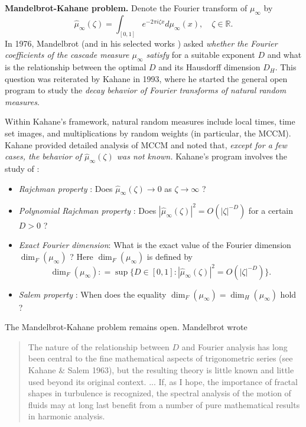 \documentclass[12pt]{amsart}
\theoremstyle{definition}
\theoremstyle{remark}
\numberwithin{equation}{section}
\begin{document}
{\flushleft \bf Mandelbrot-Kahane problem.}  
Denote  the Fourier transform of  $\mu_\infty$ by 
\[
\widehat{\mu}_\infty (\zeta)=\int_{[0,1]} e^{-2\pi i\zeta x}d\mu_\infty(x),\quad \zeta\in \mathbb{R}.
\]
In 1976, Mandelbrot \cite{M76} (and in his selected works \cite[pp. 402]{MA-book}) asked {\it  whether the Fourier coefficients of the cascade measure $\mu_\infty$ satisfy 
} for a suitable exponent $D$ and what is the relationship between the optimal $D$ and its Hausdorff dimension $D_H$.  This question was  reiterated  by Kahane \cite{Ka-93} in 1993, where he started the general open program to study the {\it decay behavior of Fourier transforms of natural random measures}. 

Within Kahane's framework, natural random measures include local times, time set images, and multiplications by random weights (in particular, the  MCCM). Kahane \cite{Ka-93} provided detailed analysis of MCCM and noted that,  {\it except for a few cases, the behavior of $\widehat{\mu}_\infty(\zeta)$ was not known.}  Kahane's program involves the study of : 
\begin{itemize}
	\item  {\it Rajchman property} :  Does $\widehat{\mu}_\infty (\zeta) \to 0$ as $\zeta\to\infty$ ? 
	\item  {\it Polynomial Rajchman property} : Does   $|\widehat{\mu}_\infty (\zeta)|^2 =  O ( |\zeta|^{-D})$ for a certain $D>0$ ?  
	\item {\it Exact Fourier dimension}:  What is the exact value of the Fourier dimension $\dim_F(\mu_\infty)$ ? Here $\dim_F(\mu_\infty)$ is  defined by 
\[
\dim_F(\mu_\infty): =\sup\{D \in[0,1]:  |\widehat{\mu}_\infty(\zeta)|^2 = O(|\zeta|^{-D})\}.
\]
	\item {\it Salem property} : 	When does  the equality $\dim_{F}(\mu_\infty)=\dim_H(\mu_\infty)$  hold ? 
\end{itemize} 

The Mandelbrot-Kahane problem remains open.   Mandelbrot \cite{M76}   wrote 
\begin{quote} 
The nature of the relationship
between $D$ and Fourier analysis has long been central to the fine mathematical
aspects of trigonometric series (see Kahane \& Salem 1963), but the
resulting theory is little known and little used beyond its original context. ... If, as I hope, the importance of fractal shapes in turbulence is recognized, the spectral analysis of the motion of fluids may at long last benefit from a number of pure mathematical results in harmonic analysis.
\end{quote}
\end{document}
